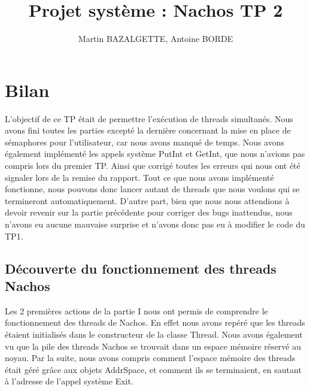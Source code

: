 \documentclass[10pt]{article}
\begin{document}
\title{Projet système : Nachos TP 2}
\author{Martin BAZALGETTE, Antoine BORDE}
\maketitle

\newpage
\tableofcontents
\newpage

\section{Bilan}
L'objectif de ce TP était de permettre l'exécution de threads simultanés.
Nous avons fini toutes les parties excepté la dernière concernant la mise en place de sémaphores pour l'utilisateur, car nous avons manqué de temps.
Nous avons également implémenté les appels système PutInt et GetInt,
que nous n'avions pas compris lors du premier TP. Ainsi que corrigé toutes les erreurs qui
nous ont été signaler lors de la remise du rapport.
Tout ce que nous avons implémenté fonctionne, nous pouvons donc lancer autant de threads que nous voulons qui se termineront automatiquement.
D'autre part, bien que nous nous attendions à devoir revenir sur la partie précédente pour corriger des bugs inattendus, nous n'avons eu aucune mauvaise surprise et n'avons donc pas eu à modifier le code du TP1.

\subsection{Découverte du fonctionnement des threads Nachos}
Les 2 premières actions de la partie I nous ont permis de comprendre le fonctionnement des threads de Nachos. En effet nous avons repéré que les threads étaient initialisés dans le constructeur de la classe Thread. Nous avons également vu que la pile des threads Nachos se trouvait dans un espace mémoire réservé au noyau.
Par la suite, nous avons compris comment l'espace mémoire des threads était géré grâce aux objets AddrSpace, et comment ils se terminaient, en sautant à l'adresse de l'appel système Exit.
\end{document}
